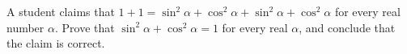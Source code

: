 A student claims that $1+1=\sin^2\alpha+\cos^2\alpha+\sin^2\alpha+\cos^2\alpha$ for every real number $\alpha$. Prove that $\sin^2\alpha+\cos^2\alpha=1$ for every real $\alpha$, and conclude that the claim is correct.
